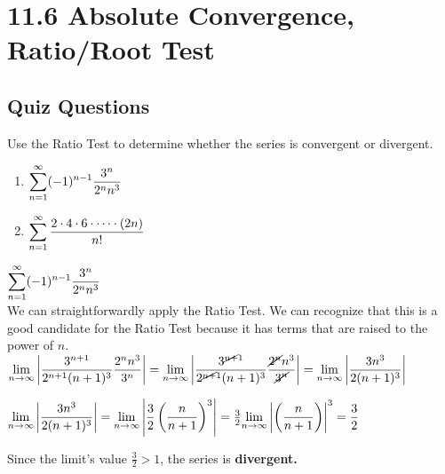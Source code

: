 \documentclass[12pt]{article}
\newcommand{\inftylim}[1]{\mathlarger{\lim_{n \to \infty}#1}}
\begin{document}
\section*{11.6 Absolute Convergence, Ratio/Root Test}
\subsection*{Quiz Questions}
Use the Ratio Test to determine whether the series is convergent or divergent.
\begin{enumerate}[label=\alph*)]
\item $\mathlarger{\sum^{\infty}_{n=1} (-1)^{n-1} \frac{3^n}{2^n n^3}}$
\item $\mathlarger{\sum^{\infty}_{n=1} \frac{2 \cdot 4 \cdot 6 \cdot \dots \cdot (2n)}{n!}}$
\end{enumerate}

\begin{solution}
$\mathlarger{\sum^{\infty}_{n=1} (-1)^{n-1} \frac{3^n}{2^n n^3}}$ ~\\

We can straightforwardly apply the Ratio Test. We can recognize that this is a good candidate for the Ratio Test because it has terms that are raised to the power of $n$. ~\\

$\inftylim{ \left|  \frac{3^{n + 1}}{2^{n + 1}(n + 1)^{3}} \frac{2^{n}n^{3}}{3^{n}} \right|   } = \inftylim{ \left|  \frac{3^{\cancel{n + }1}}{2^{\cancel{n + }1}(n + 1)^{3}} \frac{\cancel{2^{n}}n^{3}}{\cancel{3^{n}}} \right|   } = \inftylim{ \left| \frac{3n^3}{2(n + 1)^3} \right| }$

$\inftylim{ \left| \frac{3n^3}{2(n + 1)^3} \right| } = \inftylim{ \left| \frac{3}{2} \left(\frac{n}{n + 1}\right)^{3} \right| } = \frac{3}{2} \inftylim{ \left|  \left(\frac{n}{n + 1}\right) \right|^{3} = \frac{3}{2} }$

Since the limit's value $\frac{3}{2} > 1$, the series is \textbf{divergent.}

\end{solution}
\end{document}
